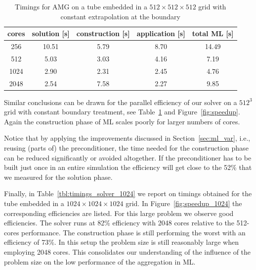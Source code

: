 \begin{table}[htb]
  \begin{center}
    \begin{tabular}{ccccc}
      \hline
      cores & solution [s] & construction [s] & application [s] & total ML [s] \\
      \hline
      256  &  10.51 &  5.79 &  8.70 &  14.49 \\
      512  &  5.03 &  3.03 &  4.16 &  7.19 \\
      1024 &  2.90 &  2.31 &  2.45 &  4.76 \\
      2048 &  2.54 &  7.58 &  2.27 &  9.85 \\
      \hline
    \end{tabular}
    \caption{Timings for AMG on a tube embedded in a $512\times512\times512$
      grid with constant extrapolation at the boundary}
    \label{tbl:timings_solver_512} 
  \end{center}
\end{table}

Similar conclusions can be drawn for the parallel efficiency of our
solver on a $512^3$ grid with constant boundary treatment, see
Table~\ref{tbl:timings_solver_512} and Figure~\ref{fig:speedup}.  Again the
construction phase of ML scales poorly for larger numbers of cores.

Notice that by applying the improvements discussed in
Section~\ref{sec:ml_var}, i.e., reusing (parts of) the preconditioner,
the time needed for the construction phase can be reduced significantly
or avoided altogether.  If the preconditioner has to be built just once
in an entire simulation the efficiency will get close to the 52\% that
we measured for the solution phase.  


Finally, in Table~\ref{tbl:timings_solver_1024} we report on timings
obtained for the tube embedded in a $1024\times1024\times1024$ grid.  In
Figure~\ref{fig:speedup_1024} the corresponding efficiencies are listed.
For this large problem we observe good efficiencies.  The solver runs at
82\% efficiency with 2048 cores relative to the 512-cores performance.
The construction phase is still performing the worst with an efficiency
of 73\%.  In this setup the problem size is still reasonably large when
employing 2048 cores.  This consolidates our understanding of the
influence of the problem size on the low performance of the aggregation
in ML.

